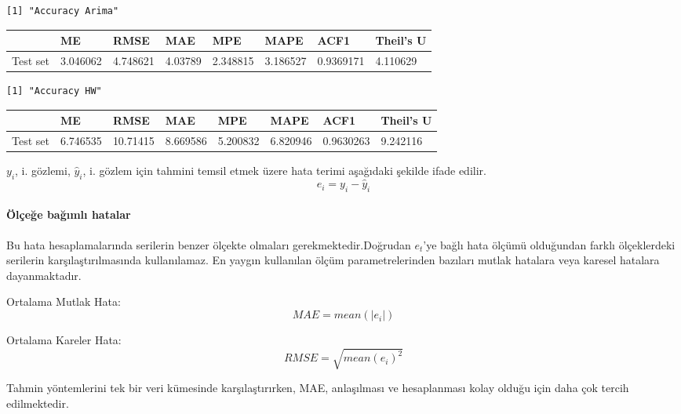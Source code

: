 \documentclass[11pt]{article}
\begin{document}
    \begin{Verbatim}[commandchars=\\\{\}]
[1] "Accuracy Arima"

    \end{Verbatim}

    \begin{tabular}{r|lllllll}
  & ME & RMSE & MAE & MPE & MAPE & ACF1 & Theil's U\\
\hline
	Test set & 3.046062  & 4.748621  & 4.03789   & 2.348815  & 3.186527  & 0.9369171 & 4.110629 \\
\end{tabular}


    
    \begin{Verbatim}[commandchars=\\\{\}]
[1] "Accuracy HW"

    \end{Verbatim}

    \begin{tabular}{r|lllllll}
  & ME & RMSE & MAE & MPE & MAPE & ACF1 & Theil's U\\
\hline
	Test set & 6.746535  & 10.71415  & 8.669586  & 5.200832  & 6.820946  & 0.9630263 & 9.242116 \\
\end{tabular}


    
    \(y_i\), i. gözlemi, \(\hat{y}_i\), i. gözlem için tahmini temsil etmek
üzere hata terimi aşağıdaki şekilde ifade edilir. \[e_i=y_i-\hat{y}_i\]

\paragraph{Ölçeğe bağımlı
hatalar}\label{uxf6luxe7eux11fe-baux11fux131mlux131-hatalar}

Bu hata hesaplamalarında serilerin benzer ölçekte olmaları
gerekmektedir.Doğrudan \(e_t\)'ye bağlı hata ölçümü olduğundan farklı
ölçeklerdeki serilerin karşılaştırılmasında kullanılamaz. En yaygın
kullanılan ölçüm parametrelerinden bazıları mutlak hatalara veya karesel
hatalara dayanmaktadır.

Ortalama Mutlak Hata: \[MAE= mean(|e_i|)\]

Ortalama Kareler Hata: \[RMSE=\sqrt{mean(e_i)^2}\]

Tahmin yöntemlerini tek bir veri kümesinde karşılaştırırken, MAE,
anlaşılması ve hesaplanması kolay olduğu için daha çok tercih
edilmektedir.
\end{document}
